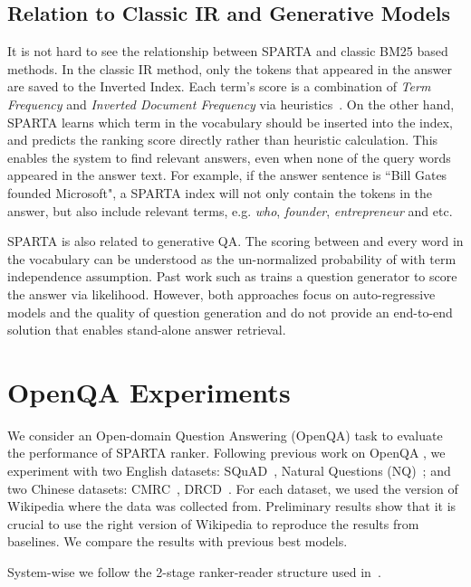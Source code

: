 \documentclass[11pt,a4paper]{article}
\begin{document}
\subsection{Relation to Classic IR and Generative Models}
It is not hard to see the relationship between SPARTA and classic BM25 based methods. In the classic IR method, only the tokens that appeared in the answer are saved to the Inverted Index. Each term's score is a combination of \textit{Term Frequency} and \textit{Inverted Document Frequency} via heuristics~\cite{manning2008introduction}. On the other hand, SPARTA learns which term in the vocabulary should be inserted into the index, and predicts the ranking score directly rather than heuristic calculation. This enables the system to find relevant answers, even when none of the query words appeared in the answer text. For example, if the answer sentence is ``Bill Gates founded Microsoft", a SPARTA index will not only contain the tokens in the answer, but also include relevant terms, e.g. \textit{who}, \textit{founder}, \textit{entrepreneur} and etc.

SPARTA is also related to generative QA. The scoring between  and every word in the vocabulary  can be understood as the un-normalized probability of  with term independence assumption.
Past work such as \citet{lewis2018generative,nogueira2019doc2query} trains a question generator to score the answer via likelihood. However, both approaches focus on auto-regressive models and the quality of question generation and do not provide an end-to-end solution that enables stand-alone answer retrieval. 
\section{OpenQA Experiments}
We consider an Open-domain Question Answering (OpenQA) task to evaluate the performance of SPARTA ranker. Following previous work on OpenQA \cite{chen2017reading, wang2019multi, xie2020distant}, we experiment with two English datasets: SQuAD~\cite{rajpurkar2016squad}, Natural Questions (NQ)~\cite{kwiatkowski2019natural}; and two Chinese datasets: CMRC~\cite{cui2018span}, DRCD~\cite{shao2018drcd}. For each dataset, we used the version of Wikipedia where the data was collected from. Preliminary results show that it is crucial to use the right version of Wikipedia to reproduce the results from baselines. We compare the results with previous best models.

System-wise we follow the 2-stage ranker-reader structure used in~\cite{chen2017reading}. 
\end{document}
